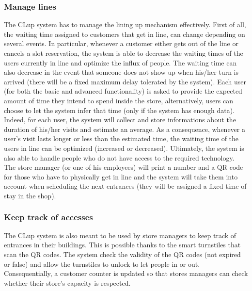 \documentclass{article}
\begin{document}
\subsubsection{Manage lines} 
The CLup system has to manage the lining up mechanism effectively. First of all, the waiting time assigned to customers that get in line, can change depending on several events. In particular, whenever a customer either gets out of the line or cancels a slot reservation, the system is able to decrease the waiting times of the users currently in line and optimize the influx of people. The waiting time can also decrease in the event that someone does not show up when his/her turn is arrived (there will be a fixed maximum delay tolerated by the system). Each user (for both the basic and advanced functionality) is asked to provide the expected amount of time they intend to spend inside the store, alternatively, users can choose to let the system infer that time (only if the system has enough data). Indeed, for each user, the system will collect and store informations about the duration of his/her visits and estimate an average. As a consequence, whenever a user’s visit lasts longer or less than the estimated time, the waiting time of the users in line can be optimized (increased or decreased). Ultimately, the system is also able to handle people who do not have access to the required technology. The store manager (or one of his employees) will print a number and a QR code for those who have to physically get in line and the system will take them into account when scheduling the next entrances (they will be assigned a fixed time of stay in the shop).
\subsubsection{Keep track of accesses} 
The CLup system is also meant to be used by store managers to keep track of entrances in their buildings. This is possible thanks to the smart turnstiles that scan the QR codes. The system check the validity of the QR codes (not expired or false) and allow the turnstiles to unlock to let people in or out. Consequentially, a customer counter is updated  so that stores managers can check whether their store’s capacity is respected.
\end{document}
